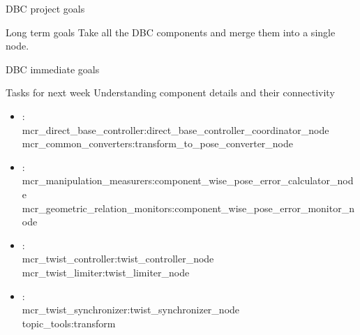 \documentclass[9pt,usenames,dvipsnames]{beamer}
\begin{document}
\begin{frame}{DBC project goals}
	\begin{alertblock}{Long term goals}
    	Take all the DBC components and merge them into a single node.
    \end{alertblock}
\end{frame}

\begin{frame}{DBC immediate goals}
	\begin{alertblock}{Tasks for next week}
	Understanding component details and their connectivity
    	\begin{itemize}
    	\item {\color{OliveGreen}{Aaqib}}:\\
    	mcr\_direct\_base\_controller:direct\_base\_controller\_coordinator\_node \\
    	mcr\_common\_converters:transform\_to\_pose\_converter\_node
    	\item {\color{OliveGreen}{Pranjal}}:\\
    	mcr\_manipulation\_measurers:component\_wise\_pose\_error\_calculator\_node \\
    	mcr\_geometric\_relation\_monitors:component\_wise\_pose\_error\_monitor\_node
    	\item {\color{OliveGreen}{Ramit}}:\\
    	mcr\_twist\_controller:twist\_controller\_node\\
    	mcr\_twist\_limiter:twist\_limiter\_node
    	\item {\color{OliveGreen}{Zahid}}:\\
    	mcr\_twist\_synchronizer:twist\_synchronizer\_node \\
    	topic\_tools:transform
    	\end{itemize}
    \end{alertblock}
\end{frame}

\end{document}

